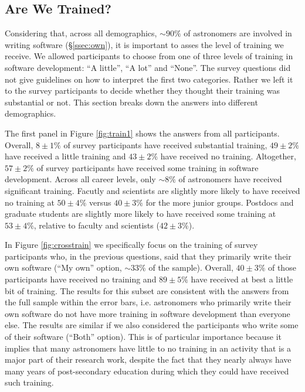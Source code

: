 \subsection{Are We Trained?}

Considering that, across all demographics, $\sim90\%$ of astronomers are involved in writing software (\S \ref{ssec:own}), it is important to asses the level of training we receive. We allowed participants to choose from one of three levels of training in software development: ``A little'', ``A lot'' and ``None''. The survey questions did not give guidelines on how to interpret the first two categories. Rather we left it to the survey participants to decide whether they thought their training was substantial or not. This section breaks down the answers into different demographics. 

The first panel in Figure \ref{fig:train1} shows the answers from all participants. Overall, $8\pm1\%$ of survey participants have received substantial training, $49\pm2\%$ have received a little training and $43\pm2\%$ have received no training. Altogether, $57\pm2\%$ of survey participants have received some training in software development. Across all career levels, only $\sim8\%$ of astronomers have received significant training. Facutly and scientists are slightly more likely to have received no training at $50\pm4\%$ versus $40\pm3\%$ for the more junior groups. Postdocs and graduate students are slightly more likely to have received some training at $53\pm4\%$, relative to faculty and scientists ($42\pm3\%$).

In Figure \ref{fig:crosstrain} we specifically focus on the training of survey participants who, in the previous questions, said that they primarily write their own software (``My own'' option, $\sim33\%$ of the sample).  Overall, $40\pm3\%$ of those participants have received no training and $89\pm5\%$ have received at best a little bit of training. The results for this subset are consistent with the answers from the full sample within the error bars, i.e. astronomers who primarily write their own software do not have more training in software development than everyone else. The results are similar if we also considered the participants who write some of their software (``Both'' option). This is of particular importance because it implies that many astronomers have little to no training in an activity that is a major part of their research work, despite the fact that they nearly always have many years of post-secondary education during which they could have received such training.

